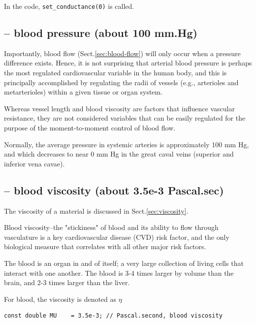 In the code, \verb!set_conductance(0)! is called.

\subsection{-- blood pressure (about 100 mm.Hg)}

Importantly, blood flow  (Sect.\ref{sec:blood-flow}) will only occur when a
pressure difference exists.
Hence, it is not surprising that arterial blood pressure is perhaps the most
regulated cardiovascular variable in the human body, and this is principally
accomplished by regulating the radii of vessels (e.g., arterioles and
metarterioles) within a given tissue or organ system.

Whereas vessel length and blood viscosity are factors that influence vascular
resistance, they are not considered variables that can be easily regulated for
the purpose of the moment-to-moment control of blood flow.


Normally, the average pressure in systemic arteries is approximately 100 mm Hg,
and which decreases to near 0 mm Hg in the great caval veins (superior and
inferior vena cavae).  

\subsection{-- blood viscosity (about 3.5e-3 Pascal.sec)}
\label{sec:viscosity-blood}


The viscosity of a material is discussed in Sect.\ref{sec:viscosity}.

Blood viscosity--the "stickiness" of blood and its ability to flow through
vasculature is a key cardiovascular disease (CVD) risk factor, and the only
biological measure that correlates with all other major risk factors.

The blood is an organ in and of itself; a very large collection of living cells
that interact with one another. The blood is 3-4 times larger by volume than the
brain, and 2-3 times larger than the liver.


For blood,  the viscosity is denoted as $\eta$
\begin{verbatim}
const double MU    = 3.5e-3; // Pascal.second, blood viscosity

\end{verbatim}

